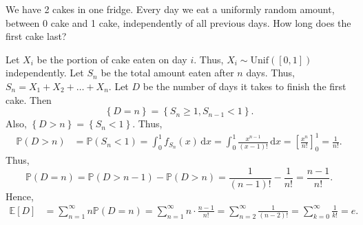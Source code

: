 \begin{eg}
    We have 2 cakes in one fridge. Every day we eat a uniformly random amount, between 0 cake and 1 cake, independently of all previous days. How long does the first cake last?  
\end{eg}

\begin{explanation}
    Let \(X_i\) be the portion of cake eaten on day \(i\). Thus, \(X_i \sim \mathrm{Unif}([0, 1]) \) independently. Let \(S_n\) be the total amount eaten after \(n\) days. Thus, \(S_n = X_1 + X_2 + \dots + X_n\). Let \(D\) be the number of days it takes to finish the first cake. Then 
    \[
        \left\{ D = n \right\} = \left\{ S_n \ge 1, S_{n-1} < 1 \right\}.  
    \]       
    Also, \(\left\{ D > n \right\} = \left\{ S_n < 1 \right\}  \). Thus,
    \begin{align*}
        \mathbb{P} (D > n) &= \mathbb{P} (S_n < 1) = \int _0^1 f_{S_n}(x) \, \mathrm{d} x = \int _0^1 \frac{x^{n-1}}{(x-1)!} \, \mathrm{d} x = \left[ \frac{x^n}{n!} \right]_0^1 = \frac{1}{n!}.  
    \end{align*}
    Thus,
    \[
        \mathbb{P} (D = n) = \mathbb{P} (D > n - 1) - \mathbb{P} (D > n) = \frac{1}{(n-1)!} - \frac{1}{n!} = \frac{n-1}{n!}.
    \]
    Hence,
    \begin{align*}
        \mathbb{E} [D] &= \sum_{n=1}^{\infty} n \mathbb{P} (D = n) = \sum_{n=1}^{\infty} n \cdot \frac{n-1}{n!} = \sum_{n=2}^{\infty} \frac{1}{(n-2)!} = \sum_{k=0}^{\infty} \frac{1}{k!} = e.    
    \end{align*}
\end{explanation}

